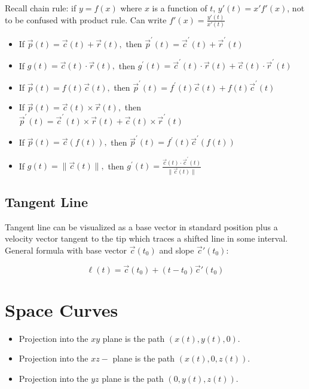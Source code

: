Recall chain rule: if $y=f(x)$ where $x$ is a function of $t$, $y'(t)=x'f'(x)$, not to be confused with product rule.
Can write $f'(x)=\frac{y'(t)}{x'(t)}$

\begin{itemize}
    \item If $\vec{p}(t)=\vec{c}(t)+\vec{r}(t),$ then $\vec{p}^{\prime}(t)=\vec{c}^{\prime}(t)+\vec{r}^{\prime}(t)$
    \item If $g(t)=\vec{c}(t) \cdot \vec{r}(t),$ then $g^{\prime}(t)=\vec{c}^{\prime}(t) \cdot \vec{r}(t)+\vec{c}(t) \cdot \vec{r}^{\prime}(t)$
    \item If $\vec{p}(t)=f(t) \vec{c}(t),$ then $\vec{p}^{\prime}(t)=f^{\prime}(t) \vec{c}(t)+f(t) \vec{c}^{\prime}(t)$
    \item If $\vec{p}(t)=\vec{c}(t) \times \vec{r}(t),$ then $\vec{p}^{\prime}(t)=\vec{c}^{\prime}(t) \times \vec{r}(t)+\vec{c}(t) \times \vec{r}^{\prime}(t)$
    \item If $\vec{p}(t)=\vec{c}(f(t)),$ then $\vec{p}^{\prime}(t)=f^{\prime}(t) \vec{c}^{\prime}(f(t))$
    \item If $g(t)=\|\vec{c}(t)\|,$ then $g^{\prime}(t)=\frac{\vec{c}(t) \cdot \vec{c}^{\prime}(t)}{\|\vec{c}(t)\|}$
\end{itemize}

\subsection{Tangent Line}

Tangent line can be visualized as a base vector in standard position plus a velocity vector
tangent to the tip which traces a shifted line in some interval. General formula with base vector $\vec{c}(t_0)$ and slope $\vec{c}'(t_0)$:

\[\boxed{\ell(t)=\vec{c}(t_0)+(t-t_0)\vec{c}'(t_0)}\]

\section{Space Curves}

\begin{itemize}
    \item Projection into the $x y$ plane is the path $(x(t), y(t), 0)$.
    \item Projection into the $x z-$ plane is the path $(x(t), 0, z(t))$.
    \item Projection into the $y z$ plane is the path $(0, y(t), z(t))$.
\end{itemize}

